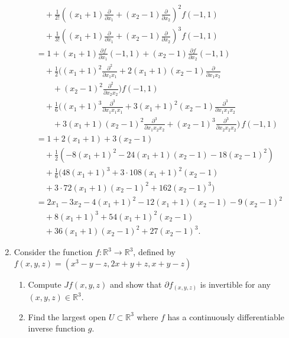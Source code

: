 \documentclass{article}
\begin{document}
\begin{enumerate}
\begin{align*}
        &\quad+\frac{1}{2!}\left( (x_1+1)\frac{\partial }{\partial x_1} +(x_2-1)\frac{\partial }{\partial x_2}  \right) ^{2}f(-1,1)\\
        &\quad+\frac{1}{3!}\left( (x_1+1)\frac{\partial }{\partial x_1} +(x_2-1)\frac{\partial }{\partial x_2}  \right) ^{3}f(-1,1)\\
        &= 1+(x_1+1)\frac{\partial f}{\partial x_1}(-1,1) +(x_2-1)\frac{\partial f}{\partial x_2}(-1,1) \\
        &\quad+\frac{1}{2}\bigg( (x_1+1)^2\frac{\partial^2 }{\partial x_1x_1} +2 (x_1+1)(x_2-1)\frac{\partial }{\partial x_1x_2}\\
        &\quad\quad+(x_2-1)^2\frac{\partial^2 }{\partial x_2x_2} \bigg)f(-1,1)  \\
        &\quad+\frac{1}{6}\bigg( (x_1+1)^3\frac{\partial^3 }{\partial x_1x_1x_1}+3(x_1+1)^2(x_2-1) \frac{\partial^3 }{\partial x_1x_1x_2}  \\
        &\quad\quad +3(x_1+1)(x_2-1)^2 \frac{\partial^3 }{\partial x_1x_2x_2}+(x_2-1)^3\frac{\partial^3 }{\partial x_2x_2x_2}  \bigg)\, f(-1,1)\\
        &= 1+2(x_1+1)+3(x_2-1) \\
        &\quad+\frac{1}{2}\left( -8(x_1+1)^2 -24 (x_1+1)(x_2-1)-18(x_2-1)^2\right) \\
        &\quad+\frac{1}{6}\bigg( 48(x_1+1)^3+3\cdot 108(x_1+1)^2(x_2-1) \\&\quad+3\cdot 72(x_1+1)(x_2-1)^2 +162(x_2-1)^3 \bigg)\\
        &= 2x_1-3x_2 -4(x_1+1)^2 -12 (x_1+1)(x_2-1)-9(x_2-1)^2 \\
        &\quad+ 8(x_1+1)^3+54(x_1+1)^2(x_2-1) \\&\quad+36(x_1+1)(x_2-1)^2 +27(x_2-1)^3 
    .\end{align*}

\iffalse
\item Consider the function $f:\mathbb{R}^3\rightarrow \mathbb{R}^3$, defined by
$f(x,y,z) = (x^3-y-z, 2x+y+z, x+y-z)$

\begin{enumerate}[label= (\alph*)] 
\item Compute $Jf(x,y,z)$ and show that $\partial f_{(x,y,z)}$ is invertible for any $(x,y,z)\in\mathbb{R}^3$.

\item Find the largest open $U\subset \mathbb{R}^3$ where $f$ has a continuously differentiable inverse function $g$.
\end{enumerate}


\end{enumerate}
\end{document}
